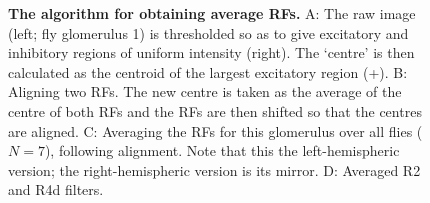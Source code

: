 \begin{comment}
Neural networks were trained to estimate the elevation and azimuth of randomly generated `blob' stimuli ($N=10,000$) from raw views ($N=36$~pixels; blue), R2 neurons ($N=28$; red), R4d neurons ($N=14$; green) or R2 and R4 neurons ($N=42$; magenta). For each visual input a network was trained 100 times and average performance with blobs that were not part of the training set was taken.
A and B: Plots of elevation and azimuth of the test visual stimuli \emph{vs} the mean network output ($N=100$). The dashed line indicates ideal performance (i.e. $y=x$) and the thickness of the lines at each point shows standard error.
The possible values of elevation and azimuth were constrained by the size of the fruit fly visual field (approx. $120\degree \times 270\degree$). Within this range there were 22 possible values.
C and D: Average network performance (mean square error) for networks trained to recover elevation (C) or azimuth (D) and for each type of visual input (colour code as above). Standard error is shown, but is very small.
Neural networks were trained to estimate the orientation and size of randomly generated 'blob' stimuli ($N=1000$) from different visual encodings (details same as for Figure~\ref{fig:elaz}).
A and B: Network performance in recovering stimulus orientation and size. Orientation was constrained between 0\degree\ and 90\degree, to avoid the problem of aliasing, and varied with 22 levels (conventions as in Figure~\ref{fig:elaz}).
C and D: Average network performance (mean square error) for networks trained to recover orientation (C) or size (D) and for each type of visual input (colour code as previously). Standard error is shown, but is very small.
\end{comment}

\begin{figure}[htp]
	\caption{
		{\bf The algorithm for obtaining average \acp{RF}.}
		A: The raw image (left; fly glomerulus 1) is thresholded so as to give excitatory and inhibitory regions of uniform intensity (right).
		The `centre' is then calculated as the centroid of the largest excitatory region (+).
		B: Aligning two \acp{RF}.
		The new centre is taken as the average of the centre of both \acp{RF} and the \acp{RF} are then shifted so that the centres are aligned.
		C: Averaging the \acp{RF} for this glomerulus over all flies ($N=7$), following alignment.
		Note that this the left-hemispheric version; the right-hemispheric version is its mirror.
		D: Averaged R2 and R4d filters.
		}
	\label{fig:avkernels}
\end{figure}


